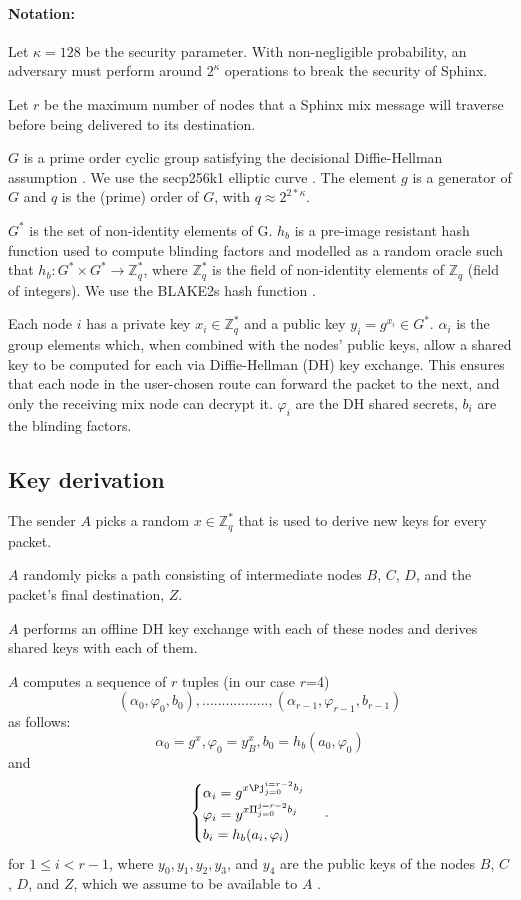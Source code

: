\paragraph{Notation:}Let $\kappa=128$ be the security parameter. With non-negligible probability, an adversary must perform around $2^\kappa$ operations to break the security of Sphinx.

Let $r$ be the maximum number of nodes that a Sphinx mix message will traverse before being delivered to its destination.

$G$ is a prime order cyclic group satisfying the decisional Diffie-Hellman assumption \cite{Boneh_1998}. We use the secp256k1 elliptic curve \cite{sec2}. The element $g$ is a generator of $G$ and $q$ is the (prime) order of $G$, with $q\approx2^{2*\kappa}$.

$G^*$ is the set of non-identity elements of G. $h_b$ is a pre-image resistant hash function used to compute blinding factors and modelled as a random oracle such that
$h_b:G^*\times G^*\rightarrow\mathbb{Z}^*_q$, where $\mathbb{Z}^*_q$ is the field of non-identity elements of $\mathbb{Z}_q$ (field of integers). We use the BLAKE2s hash function \cite{blake2}.

Each node $i$ has a private key $x_{i}\in \mathbb{Z}^*_q$ and a public key $y_{i}=g^{x_{i}}\in G^*$.
$\alpha_i$ is the group elements which, when combined with the nodes’ public keys, allow a shared key to be computed for each via Diffie-Hellman (DH) key exchange. This ensures that each node in the user-chosen route can forward the packet to the next, and only the receiving mix node can decrypt it.
$\varphi_i$ are the DH shared secrets, $b_i$ are the blinding factors.

\subsection{Key derivation}
The sender $A$ picks a random $x\in \mathbb{Z}^*_q$ that is used to derive new keys for every packet.

$A$ randomly picks a path consisting of intermediate nodes $B$, $C$, $D$, and the packet's final destination, $Z$.

$A$ performs an offline DH key exchange with each of these nodes and derives shared keys with each of them.

$A$ computes a sequence of $r$ tuples (in our case $r$=4)  $$(\alpha_0,\varphi_0,b_0),.................,(\alpha_{r-1},\varphi_{r-1},b_{r-1})$$ as follows:
$$\alpha_0=g^x,\varphi_0=y^x_B,b_0=h_b(a_0,\varphi_0)$$
and
\begin{equation}
    \begin{cases}
        \alpha_i=g^{x\Pj_{j=0}^{i=r-2}b_j}\\
        \varphi_i=y^{x\Pi_{j=0}^{j=r-2}b_j} \\
        b_i=h_b(a_i,\varphi_i)
    \end{cases}\,.
    \label{eq:1}
\end{equation}
for $1\le i < r-1$, where $y_0,y_1, y_2, y_3$, and $y_4$ are the public keys of the nodes $B$, $C$, $D$, and $Z$, which we assume to be available to $A$ .

